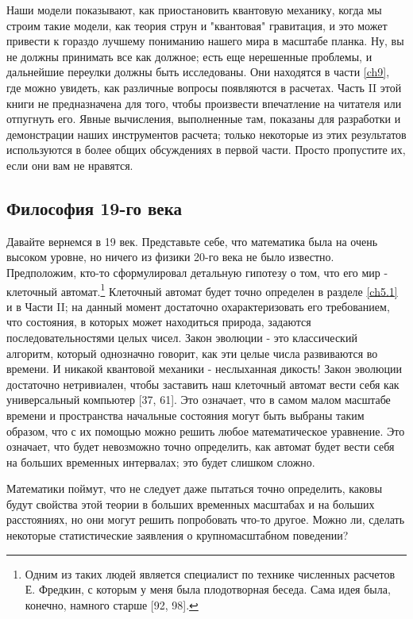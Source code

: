 \documentclass[main.tex]{subfiles}
\begin{document}
Наши модели показывают, как приостановить квантовую механику, когда мы строим такие модели, как теория струн и "квантовая" гравитация, и это может привести к гораздо лучшему пониманию нашего мира в масштабе планка. Ну, вы не должны принимать все как должное; есть еще нерешенные проблемы, и дальнейшие переулки должны быть исследованы. Они находятся в части \ref{ch9}, где можно увидеть, как различные вопросы появляются в расчетах. Часть II этой книги не предназначена для того, чтобы произвести впечатление на читателя или отпугнуть его. Явные вычисления, выполненные там, показаны для разработки и демонстрации наших инструментов расчета; только некоторые из этих результатов используются в более общих обсуждениях в первой части. Просто пропустите их, если они вам не нравятся.  

\subsection{Философия 19-го века}\label{ch1.3}

Давайте вернемся в 19 век. Представьте себе, что математика была на очень высоком уровне, но ничего из физики 20-го века не было известно. Предположим, кто-то сформулировал детальную гипотезу о том, что его мир - клеточный автомат.\footnote{Одним из таких людей является специалист по технике численных расчетов Е. Фредкин, с которым у меня была плодотворная беседа. Сама идея была, конечно, намного старше [92, 98].} Клеточный автомат будет точно определен в разделе \ref{ch5.1} и в Части II; на данный момент достаточно охарактеризовать его требованием, что состояния, в которых может находиться природа, задаются последовательностями целых чисел. Закон эволюции - это классический алгоритм, который однозначно говорит, как эти целые числа развиваются во времени. И никакой квантовой механики - неслыханная дикость! Закон эволюции достаточно нетривиален, чтобы заставить наш клеточный автомат вести себя как универсальный компьютер [37, 61]. Это означает, что в самом малом масштабе времени и пространства начальные состояния могут быть выбраны таким образом, что с их помощью можно решить любое математическое уравнение. Это означает, что будет невозможно точно определить, как автомат будет вести себя на больших временных интервалах; это будет слишком сложно. 

Математики поймут, что не следует даже пытаться точно определить, каковы будут свойства этой теории в больших временных масштабах и на больших расстояниях, но они могут решить попробовать что-то другое. Можно ли, сделать некоторые статистические заявления о крупномасштабном поведении? 
\end{document}
